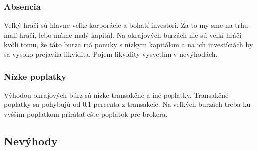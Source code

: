 \subsubsection{Absencia } 
Veľký hráči\cite{ZAC} sú hlavne veľké korporácie a bohatí investori. Za to my sme na trhu malí hráči, lebo máme malý kapitál. Na okrajových burzách nie sú veľkí hráči kvôli tomu, že táto burza má ponuky s nízkym kapitálom a na ich investíciách by sa vysoko prejavila likvidita. Pojem likvidity vysvetlím v nevýhodách. 
\subsubsection{Nízke poplatky} 
Výhodou okrajových búrz sú nízke transakčné a iné poplatky. Transakčné poplatky sa pohybujú od 0,1 percenta z transakcie. Na veľkých burzách treba ku vyšším poplatkom prirátať ešte poplatok pre brokera.
\subsection{Nevýhody} 
